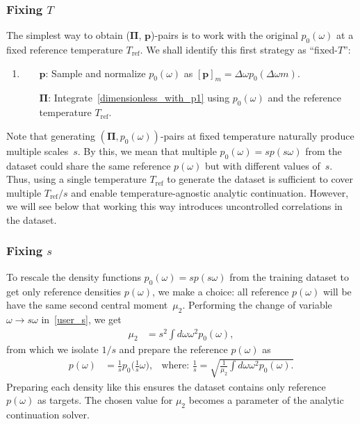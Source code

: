 \documentclass[notitlepage, 11pt, nofootinbib]{revtex4-1}
\renewcommand{\vec}[1]{\bm{#1}}
\begin{document}
\subsubsection{Fixing $T$}
The simplest way to obtain ($\vec \Pi$, $\vec p$)-pairs is to work with the original $p_0(\omega)$ at a fixed reference temperature $T_{\text{ref}}$. We shall identify this first strategy as ``fixed-$T$'':
\begin{enumerate}
    \item \label{fixT}
    \begin{itemize}
        \item[$\vec p$:] Sample and normalize $p_0(\omega)$ as $[\vec p]_m = \Delta\omega p_0(\Delta\omega m)$.
        \item[$\vec \Pi$:] Integrate~\eqref{dimensionless_with_p1} using $p_0(\omega)$ and the reference temperature $T_{\text{ref}}$.
    \end{itemize}
\end{enumerate}
Note that generating $(\vec\Pi, p_0(\omega))$-pairs at fixed temperature naturally produce multiple scales~$s$. By this, we mean that multiple $p_0(\omega)=sp(s\omega)$ from the dataset could share the same reference $p(\omega)$ but with different values of~$s$.
Thus, using a single temperature $T_{\text{ref}}$ to generate the dataset is sufficient to cover multiple $T_{\text{ref}}/s$ and enable temperature-agnostic analytic continuation. However, we will see below that working this way introduces uncontrolled correlations in the dataset.


\subsubsection{Fixing $s$}
\label{sec_data_rescaling}
To rescale the density functions $p_0(\omega) = sp(s\omega)$ from the training dataset to get only reference densities $p(\omega)$, we make a choice: all reference $p(\omega)$ will be have the same second central moment~$\mu_2$. Performing the change of variable $\omega \rightarrow s\omega$ in~\eqref{user_s}, we get
\begin{align}
\mu_2&=
s^2 \int d\omega \omega^2 p_0(\omega),
\end{align}
from which we isolate $1/s$ and prepare the reference $p(\omega)$ as
\begin{align}
\label{eq_prep_ref}
p(\omega) 
&=
\frac{1}{s}p_0\big(\frac{1}{s}\omega\big),
&\text{where: }
\frac{1}{s}
=
\sqrt{
\frac{1}{\mu_2}
\int d\omega \omega^2 p_0(\omega).
}
\end{align}
Preparing each density like this ensures the dataset contains only reference $p(\omega)$ as targets. The chosen value for $\mu_2$ becomes a parameter of the analytic continuation solver.
\end{document}
